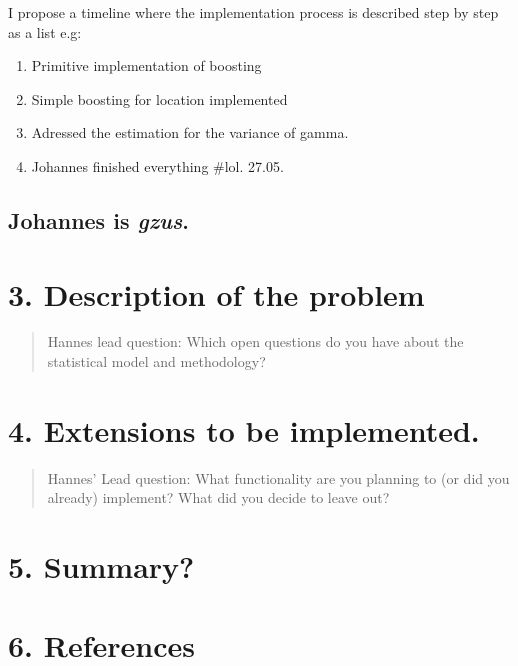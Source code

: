 \documentclass[
]{report}
\providecommand{\tightlist}{%
  \setlength{\itemsep}{0pt}\setlength{\parskip}{0pt}}
\begin{document}
I propose a timeline where the implementation process is described step
by step as a list e.g:

\begin{enumerate}
\def\labelenumi{\arabic{enumi}.}
\tightlist
\item
  Primitive implementation of boosting
\item
  Simple boosting for location implemented
\item
  Adressed the estimation for the variance of gamma.
\item
  Johannes finished everything \#lol. 27.05.
\end{enumerate}

\hypertarget{johannes-is-gzus.}{%
\section{\texorpdfstring{Johannes is
\emph{gzus}.}{Johannes is gzus.}}\label{johannes-is-gzus.}}

\hypertarget{description-of-the-problem}{%
\chapter{3. Description of the
problem}\label{description-of-the-problem}}

\begin{quote}
Hannes lead question: Which open questions do you have about the
statistical model and methodology?
\end{quote}

\hypertarget{extensions-to-be-implemented.}{%
\chapter{4. Extensions to be
implemented.}\label{extensions-to-be-implemented.}}

\begin{quote}
Hannes' Lead question: What functionality are you planning to (or did
you already) implement? What did you decide to leave out?
\end{quote}

\hypertarget{summary}{%
\chapter{5. Summary?}\label{summary}}

\hypertarget{references}{%
\chapter*{6. References}\label{references}}
\end{document}
